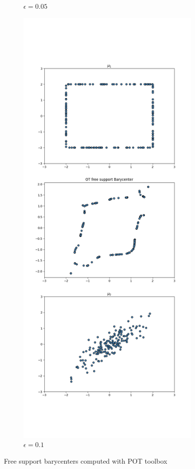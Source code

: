 \documentclass[a4paper, 11pt]{article}
\begin{document}
\begin{figure}
\begin{subfigure}{0.5\textwidth}
        \caption{$\epsilon=0.05$}
    \end{subfigure}
    \begin{subfigure}{.5\textwidth}
        \centering
        \includegraphics[width=\textwidth]{figures/ot_barycenter_reg0.1.png}
        \caption{$\epsilon=0.1$}
    \end{subfigure}
    \caption{Free support barycenters computed with POT toolbox}
    \label{pot2}
\end{figure}
\end{document}
